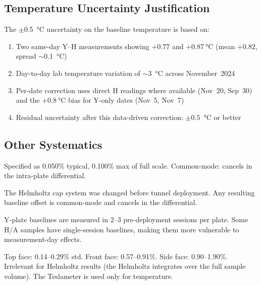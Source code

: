 \documentclass[11pt,letterpaper]{article}
\begin{document}
\subsection{Temperature Uncertainty Justification}

The $\pm$\SI{0.5}{\celsius} uncertainty on the baseline temperature is based on:
\begin{enumerate}
    \item Two same-day Y--H measurements showing $+0.77$ and $+\SI{0.87}{\celsius}$
    (mean $+0.82$, spread $\sim$\SI{0.1}{\celsius})
    \item Day-to-day lab temperature variation of $\sim$\SI{3}{\celsius} across
    November~2024
    \item Per-date correction uses direct H readings where available
    (Nov~20, Sep~30) and the $+\SI{0.8}{\celsius}$ bias for Y-only dates
    (Nov~5, Nov~7)
    \item Residual uncertainty after this data-driven correction: $\pm 0.5$~\si{\celsius}
    or better
\end{enumerate}

\subsection{Other Systematics}

\begin{description}[style=nextline]
    \item[Helmholtz DC accuracy]
    Specified as 0.050\% typical, 0.100\% max of full scale. Common-mode:
    cancels in the intra-plate differential.

    \item[Cap/rig changes]
    The Helmholtz cap system was changed before tunnel deployment. Any resulting
    baseline offset is common-mode and cancels in the differential.

    \item[Baseline robustness]
    Y-plate baselines are measured in 2--3 pre-deployment sessions per plate.
    Some H/A samples have single-session baselines, making them more vulnerable
    to measurement-day effects.

    \item[Teslameter positioning noise]
    Top face: 0.14--0.29\% std. Front face: 0.57--0.91\%. Side face:
    0.90--1.90\%. Irrelevant for Helmholtz results (the Helmholtz integrates
    over the full sample volume). The Teslameter is used only for temperature.
\end{description}
\end{document}
